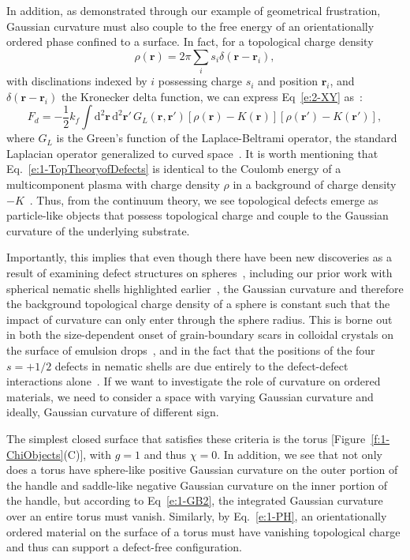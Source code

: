 In addition, as demonstrated through our example of geometrical frustration, Gaussian curvature must also couple to the free energy of an orientationally ordered phase confined to a surface.
In fact, for a topological charge density
\begin{equation}
  \rho(\mathbf{r}) = 2 \pi \sum\limits_i s_{i}\delta(\mathbf{r} - \mathbf{r}_{i}),\label{e:1-ChargeDens}
\end{equation}
with disclinations indexed by $i$ possessing charge $s_{i}$ and position $\mathbf{r}_{i}$, and $\delta(\mathbf{r} - \mathbf{r}_{i})$ the Kronecker delta function, we can express Eq~\ref{e:2-XY} as~\cite{RN42,RN175,RN17}:
\begin{equation}
  F_d = -\frac{1}{2} k_f \int \textrm{d}^2\mathbf{r} \, \textrm{d}^2\mathbf{r}' \, G_L(\mathbf{r},\mathbf{r}') [\rho(\mathbf{r})-K(\mathbf{r})] [\rho(\mathbf{r}')-K(\mathbf{r}')],\label{e:1-TopTheoryofDefects}
\end{equation}
where $G_L$ is the Green's function of the Laplace-Beltrami operator, the standard Laplacian operator generalized to curved space~\cite{RN17}.
It is worth mentioning that Eq.~\ref{e:1-TopTheoryofDefects} is identical to the Coulomb energy of a multicomponent plasma with charge density $\rho$ in a background of charge density $-K$~\cite{RN17}.
Thus, from the continuum theory, we see topological defects emerge as particle-like objects that possess topological charge and couple to the Gaussian curvature of the underlying substrate.

Importantly, this implies that even though there have been new discoveries as a result of examining defect structures on spheres~\cite{RN106,RN26,RN110,RN76,RN101,RN165}, including our prior work with spherical nematic shells highlighted earlier~\cite{RN45,RN105}, the Gaussian curvature and therefore the background topological charge density of a sphere is constant such that the impact of curvature can only enter through the sphere radius.
This is borne out in both the size-dependent onset of grain-boundary scars in colloidal crystals on the surface of emulsion drops~\cite{RN26,RN110}, and in the fact that the positions of the four $s = +1/2$ defects in nematic shells are due entirely to the defect-defect interactions alone~\cite{RN45}.
If we want to investigate the role of curvature on ordered materials, we need to consider a space with varying Gaussian curvature and ideally, Gaussian curvature of different sign.

The simplest closed surface that satisfies these criteria is the torus [Figure~\ref{f:1-ChiObjects}(C)], with $g = 1$ and thus $\chi = 0$.
In addition, we see that not only does a torus have sphere-like positive Gaussian curvature on the outer portion of the handle and saddle-like negative Gaussian curvature on the inner portion of the handle, but according to Eq~\ref{e:1-GB2}, the integrated Gaussian curvature over an entire torus must vanish.
Similarly, by Eq.~\ref{e:1-PH}, an orientationally ordered material on the surface of a torus must have vanishing topological charge and thus can support a defect-free configuration.

